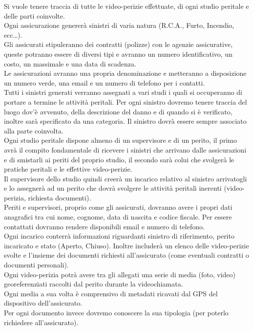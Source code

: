 \documentclass[a4paper,12pt]{report}
\begin{document}
Si vuole tenere traccia di tutte le video-perizie effettuate, di ogni studio peritale e delle parti coinvolte. 
\\
Ogni assicurazione genererà sinistri di varia natura (R.C.A., Furto, Incendio, ecc…).
\\
Gli assicurati stipuleranno dei contratti (polizze) con le agenzie assicurative, queste potranno essere di diversi tipi e avranno un numero identificativo, un costo, un massimale e una data di scadenza.
\\
Le assicurazioni avranno una propria denominazione e metteranno a disposizione un numero verde, una email e un numero di telefono per i contatti.
\\
Tutti i sinistri generati verranno assegnati a vari studi i quali si occuperanno di portare a termine le attività peritali. Per ogni sinistro dovremo tenere traccia del luogo dov’è avvenuto, della descrizione del danno e di quando si è verificato, inoltre sarà specificato da una categoria.
Il sinistro dovrà essere sempre associato alla parte coinvolta.
\\
Ogni studio peritale dispone almeno di un supervisore e di un perito, il primo avrà il compito fondamentale di ricevere i sinistri che arrivano dalle assicurazioni e di smistarli ai periti del proprio studio, il secondo sarà colui che svolgerà le pratiche peritali e le effettive video-perizie.
\\
Il supervisore dello studio quindi creerà un incarico relativo al sinistro arrivatogli e lo assegnerà ad un perito che dovrà svolgere le attività peritali inerenti (video-perizia, richiesta documenti).
\\
Periti e supervisori, proprio come gli assicurati, dovranno avere i propri dati anagrafici tra cui nome, cognome, data di nascita e codice fiscale. Per essere contattati dovranno rendere disponibili email e numero di telefono.
\\
Ogni incarico conterrà informazioni riguardanti sinistro di riferimento, perito incaricato e stato (Aperto, Chiuso).
Inoltre includerà un elenco delle video-perizie svolte e l’insieme dei documenti richiesti all’assicurato (come eventuali contratti o documenti personali).
\\
Ogni video-perizia potrà avere tra gli allegati una serie di media (foto, video) georeferenziati raccolti dal perito durante la videochiamata.
\\
Ogni media a sua volta è comprensivo di metadati ricavati dal GPS del dispositivo dell’assicurato.
\\
Per ogni documento invece dovremo conoscere la sua tipologia (per poterlo richiedere all’assicurato).
\end{document}
